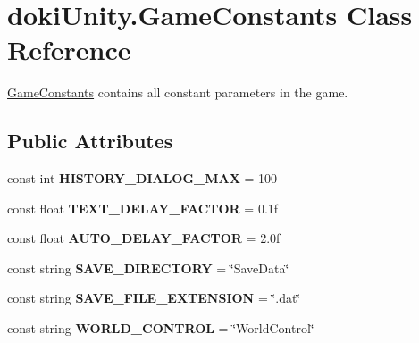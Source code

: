 \hypertarget{classdoki_unity_1_1_game_constants}{}\section{doki\+Unity.\+Game\+Constants Class Reference}
\label{classdoki_unity_1_1_game_constants}


\hyperlink{classdoki_unity_1_1_game_constants}{Game\+Constants} contains all constant parameters in the game.  


\subsection*{Public Attributes}
\begin{DoxyCompactItemize}
\item 
const int {\bfseries H\+I\+S\+T\+O\+R\+Y\+\_\+\+D\+I\+A\+L\+O\+G\+\_\+\+M\+AX} = 100\hypertarget{classdoki_unity_1_1_game_constants_ae08d31aea326af2bb4545b4c64255e76}{}\label{classdoki_unity_1_1_game_constants_ae08d31aea326af2bb4545b4c64255e76}

\item 
const float {\bfseries T\+E\+X\+T\+\_\+\+D\+E\+L\+A\+Y\+\_\+\+F\+A\+C\+T\+OR} = 0.\+1f\hypertarget{classdoki_unity_1_1_game_constants_a68cd99a33b270287a96044e24ce0cf84}{}\label{classdoki_unity_1_1_game_constants_a68cd99a33b270287a96044e24ce0cf84}

\item 
const float {\bfseries A\+U\+T\+O\+\_\+\+D\+E\+L\+A\+Y\+\_\+\+F\+A\+C\+T\+OR} = 2.\+0f\hypertarget{classdoki_unity_1_1_game_constants_a970622528e4b948ebfbe877ea6ff3d40}{}\label{classdoki_unity_1_1_game_constants_a970622528e4b948ebfbe877ea6ff3d40}

\item 
const string {\bfseries S\+A\+V\+E\+\_\+\+D\+I\+R\+E\+C\+T\+O\+RY} = \char`\"{}Save\+Data\char`\"{}\hypertarget{classdoki_unity_1_1_game_constants_a707a6d43f9ca92fa8c2437c0d5d1f4ef}{}\label{classdoki_unity_1_1_game_constants_a707a6d43f9ca92fa8c2437c0d5d1f4ef}

\item 
const string {\bfseries S\+A\+V\+E\+\_\+\+F\+I\+L\+E\+\_\+\+E\+X\+T\+E\+N\+S\+I\+ON} = \char`\"{}.dat\char`\"{}\hypertarget{classdoki_unity_1_1_game_constants_aa301306956f3aecff6a5351b7004c184}{}\label{classdoki_unity_1_1_game_constants_aa301306956f3aecff6a5351b7004c184}

\item 
const string {\bfseries W\+O\+R\+L\+D\+\_\+\+C\+O\+N\+T\+R\+OL} = \char`\"{}World\+Control\char`\"{}\hypertarget{classdoki_unity_1_1_game_constants_adbfa184da47143163320c2c9cc078ce2}{}\label{classdoki_unity_1_1_game_constants_adbfa184da47143163320c2c9cc078ce2}


\end{DoxyCompactItemize}
